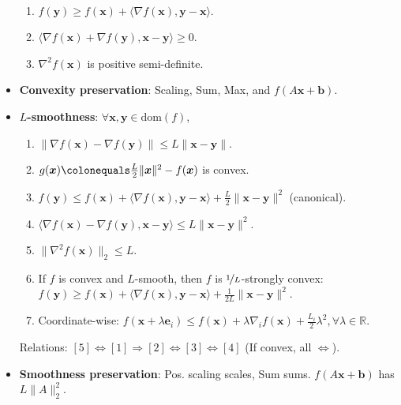 \documentclass[8pt,a4paper]{extarticle}
\newcommand{\R}{\mathbb{R}}
\renewcommand{\vec}[1]{\bm{#1}}
\newcommand{\mat}[1]{#1}
\newcommand{\dom}[1]{\mathrm{dom}(#1)}
\newenvironment{topic}[1]
{\textbf{\sffamily \colorbox{black}{\rlap{\textbf{\textcolor{white}{#1}}}\hspace{\linewidth}\hspace{-2\fboxsep}}} \\ \vspace{0.2cm}}
{}
\begin{document}
\begin{multicols*}{2}
\begin{topic}{Definitions}
\begin{itemize}
\begin{enumerate}
                      \item $f(\vec{y}) \geq f(\vec{x}) + \langle \nabla f(\vec{x}), \vec{y} - \vec{x} \rangle$.
                      \item $\langle \nabla f(\vec{x}) + \nabla f(\vec{y}), \vec{x} - \vec{y} \rangle \geq 0$.
                      \item $\nabla^2 f(\vec{x})$ is positive semi-definite.
                  \end{enumerate}
            \item \textbf{Convexity preservation}: Scaling, Sum, Max, and $f(\mat{A} \vec{x} + \vec{b})$.
            \item \textbf{$L$-smoothness}: $\forall \vec{x}, \vec{y} \in \dom{f}$,
                  \begin{enumerate}
                      \item $\| \nabla f(\vec{x}) - \nabla f(\vec{y}) \| \leq L \| \vec{x} - \vec{y} \|$.
                      \item $g(\vec{x}) \colonequals \frac{L}{2} \| \vec{x} \|^2 - f(\vec{x})$ is convex.
                      \item $f(\vec{y}) \leq f(\vec{x}) + \langle \nabla f(\vec{x}), \vec{y} - \vec{x} \rangle + \frac{L}{2} \| \vec{x} - \vec{y} \|^2$ (canonical).
                      \item $\langle \nabla f(\vec{x}) - \nabla f(\vec{y}), \vec{x} - \vec{y} \rangle \leq L \| \vec{x} - \vec{y} \|^2$.
                      \item $\| \nabla^2 f(\vec{x}) \|_2 \leq L$.
                      \item If $f$ is convex and $L$-smooth, then $f$ is $\nicefrac{1}{L}$-strongly convex: \\ $f(\vec{y}) \geq
                                f(\vec{x}) + \langle \nabla f(\vec{x}), \vec{y} - \vec{x} \rangle + \frac{1}{2L} \| \vec{x} -
                                \vec{y} \|^2$.
                      \item Coordinate-wise: $f(\vec{x} + \lambda \vec{e}_i) \leq f(\vec{x}) + \lambda \nabla_i f(\vec{x}) +
                                \frac{L_i}{2} \lambda^2, \forall \lambda \in \R$.
                  \end{enumerate}
                  Relations: $[5] \Leftrightarrow [1] \Rightarrow [2] \Leftrightarrow [3] \Leftrightarrow [4]$ (If convex, all $\Leftrightarrow$).
            \item \textbf{Smoothness preservation}: Pos. scaling scales, Sum sums. $f(\mat{A} \vec{x} + \vec{b})$ has $L \| \mat{A} \|_2^2$.

\end{itemize}
\end{topic}
\end{multicols*}
\end{document}
